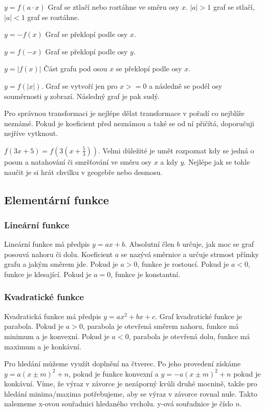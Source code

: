 \documentclass[12pt]{article}
\begin{document}
$y = f(a \cdot x)$ Graf se ztlačí nebo roztáhne ve směru osy $x$. $|a| > 1$ graf se stlačí, $|a| < 1$
graf se roztáhne.

$y = -f(x)$ Graf se překlopí podle osy $x$.

$y = f(-x)$ Graf se překlopí podle osy $y$.

$y = |f(x)|$ Část grafu pod osou $x$ se překlopí podle osy $x$.

$y = f(|x|)$. Graf se vytvoří jen pro $x >= 0$ a následně se podél osy souměrnosti $y$ zobrazí.
Následný graf je pak sudý.

Pro správnou transformaci je nejlépe dělat transformace v pořadí co nejblíže neznámé. Pokud je
koeficient před neznámou a také se od ní přičítá, doporučuji nejříve vytknout.

$f(3x + 5) = f(3(x + \frac{5}{3}))$. Velmi důležité je umět rozpoznat kdy se jedná o posun a 
natahování či smršťování ve směru osy $x$ a kdy $y$. Nejlépe jak se tohle naučit je si hrát chvilku
v geogebře nebo desmosu.
\subsection*{Elementární funkce}
\subsubsection*{Lineární funkce}
Lineární funkce má předpis $y = ax + b$. Absolutní člen $b$ určuje, jak moc se graf posouvá
nahoru či dolu. Koeficient $a$ se nazývá směrnice a určuje strmost přímky grafu a jakým směrem
jde. Pokud je $a > 0$, funkce je rostoucí. Pokud je $a < 0$, funkce je klesající. Pokud je $a = 0$,
funkce je konstantní.
\subsubsection*{Kvadratické funkce}
Kvadratická funkce má předpis $y = ax^2 + bx + c$. Graf kvadratické funkce je parabola. Pokud je 
$a > 0$, parabola je otevřená směrem nahoru, funkce má minimum a je konvexní. Pokud je $a < 0$,
parabola je otevřená dolu, funkce má maximum a je konkávní.

Pro hledání můžeme využít doplnění na čtverec. Po jeho provedení získáme $y = a(x \pm m)^2 + n$, pokud
je funkce konvexní a $y = -a(x \pm m)^2 + n$ pokud je konkávní. Víme, že výraz v závorce je nezáporný
kvůli druhé mocnině, takže pro hledání minima/maxima potřebujeme, aby se výraz v závorce rovnal nule.
Takto nalezneme x-ovou souřadnici hledaného vrcholu. y-ová souřadnice je číslo $n$.
\end{document}
